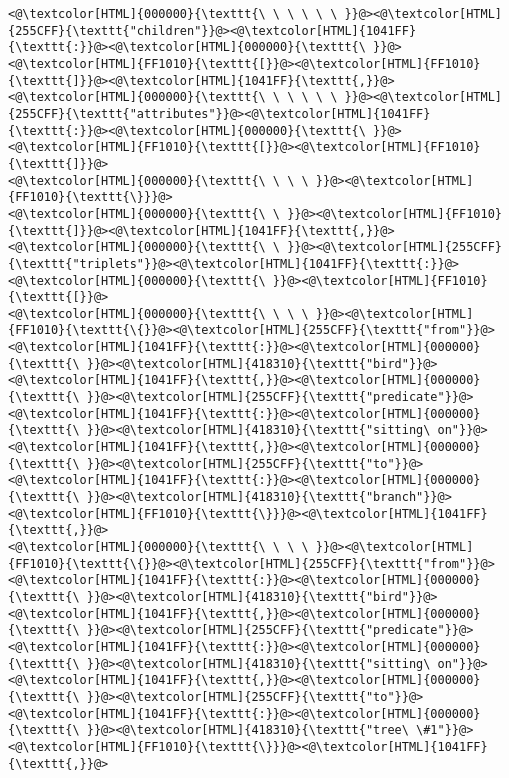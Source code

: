 \begin{lstlisting}
<@\textcolor[HTML]{000000}{\texttt{\ \ \ \ \ \ }}@><@\textcolor[HTML]{255CFF}{\texttt{"children"}}@><@\textcolor[HTML]{1041FF}{\texttt{:}}@><@\textcolor[HTML]{000000}{\texttt{\ }}@><@\textcolor[HTML]{FF1010}{\texttt{[}}@><@\textcolor[HTML]{FF1010}{\texttt{]}}@><@\textcolor[HTML]{1041FF}{\texttt{,}}@>
<@\textcolor[HTML]{000000}{\texttt{\ \ \ \ \ \ }}@><@\textcolor[HTML]{255CFF}{\texttt{"attributes"}}@><@\textcolor[HTML]{1041FF}{\texttt{:}}@><@\textcolor[HTML]{000000}{\texttt{\ }}@><@\textcolor[HTML]{FF1010}{\texttt{[}}@><@\textcolor[HTML]{FF1010}{\texttt{]}}@>
<@\textcolor[HTML]{000000}{\texttt{\ \ \ \ }}@><@\textcolor[HTML]{FF1010}{\texttt{\}}}@>
<@\textcolor[HTML]{000000}{\texttt{\ \ }}@><@\textcolor[HTML]{FF1010}{\texttt{]}}@><@\textcolor[HTML]{1041FF}{\texttt{,}}@>
<@\textcolor[HTML]{000000}{\texttt{\ \ }}@><@\textcolor[HTML]{255CFF}{\texttt{"triplets"}}@><@\textcolor[HTML]{1041FF}{\texttt{:}}@><@\textcolor[HTML]{000000}{\texttt{\ }}@><@\textcolor[HTML]{FF1010}{\texttt{[}}@>
<@\textcolor[HTML]{000000}{\texttt{\ \ \ \ }}@><@\textcolor[HTML]{FF1010}{\texttt{\{}}@><@\textcolor[HTML]{255CFF}{\texttt{"from"}}@><@\textcolor[HTML]{1041FF}{\texttt{:}}@><@\textcolor[HTML]{000000}{\texttt{\ }}@><@\textcolor[HTML]{418310}{\texttt{"bird"}}@><@\textcolor[HTML]{1041FF}{\texttt{,}}@><@\textcolor[HTML]{000000}{\texttt{\ }}@><@\textcolor[HTML]{255CFF}{\texttt{"predicate"}}@><@\textcolor[HTML]{1041FF}{\texttt{:}}@><@\textcolor[HTML]{000000}{\texttt{\ }}@><@\textcolor[HTML]{418310}{\texttt{"sitting\ on"}}@><@\textcolor[HTML]{1041FF}{\texttt{,}}@><@\textcolor[HTML]{000000}{\texttt{\ }}@><@\textcolor[HTML]{255CFF}{\texttt{"to"}}@><@\textcolor[HTML]{1041FF}{\texttt{:}}@><@\textcolor[HTML]{000000}{\texttt{\ }}@><@\textcolor[HTML]{418310}{\texttt{"branch"}}@><@\textcolor[HTML]{FF1010}{\texttt{\}}}@><@\textcolor[HTML]{1041FF}{\texttt{,}}@>
<@\textcolor[HTML]{000000}{\texttt{\ \ \ \ }}@><@\textcolor[HTML]{FF1010}{\texttt{\{}}@><@\textcolor[HTML]{255CFF}{\texttt{"from"}}@><@\textcolor[HTML]{1041FF}{\texttt{:}}@><@\textcolor[HTML]{000000}{\texttt{\ }}@><@\textcolor[HTML]{418310}{\texttt{"bird"}}@><@\textcolor[HTML]{1041FF}{\texttt{,}}@><@\textcolor[HTML]{000000}{\texttt{\ }}@><@\textcolor[HTML]{255CFF}{\texttt{"predicate"}}@><@\textcolor[HTML]{1041FF}{\texttt{:}}@><@\textcolor[HTML]{000000}{\texttt{\ }}@><@\textcolor[HTML]{418310}{\texttt{"sitting\ on"}}@><@\textcolor[HTML]{1041FF}{\texttt{,}}@><@\textcolor[HTML]{000000}{\texttt{\ }}@><@\textcolor[HTML]{255CFF}{\texttt{"to"}}@><@\textcolor[HTML]{1041FF}{\texttt{:}}@><@\textcolor[HTML]{000000}{\texttt{\ }}@><@\textcolor[HTML]{418310}{\texttt{"tree\ \#1"}}@><@\textcolor[HTML]{FF1010}{\texttt{\}}}@><@\textcolor[HTML]{1041FF}{\texttt{,}}@>

\end{lstlisting}
